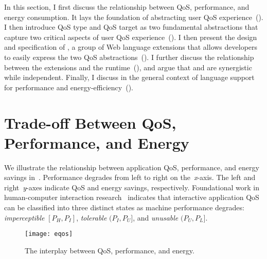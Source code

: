 In this section, I first discuss the relationship between QoS, performance, and energy consumption. It lays the foundation of abstracting user QoS experience~(). I then introduce QoS type and QoS target as two fundamental abstractions that capture two critical aspects of user QoS experience~(). I then present the design and specification of \greenweb, a group of Web language extensions that allows developers to easily express the two QoS abstractions~(). I further discuss the relationship between the \greenweb extensions and the \webrt runtime~(), and argue that \greenweb and \webrt are synergistic while independent. Finally, I discuss \greenweb in the general context of language support for performance and energy-efficiency~().

\section{Trade-off Between QoS, Performance, and Energy}
\label{sec:lang:eqos}

We illustrate the relationship between application QoS, performance, and energy savings in~. Performance degrades from left to right on the~\textit{x}-axis. The left and right~\textit{y}-axes indicate QoS and energy savings, respectively. Foundational work in human-computer interaction research~\cite{eventlatency,designUI,info_vis,response_time,percent_done,usability_engineering} indicates that interactive application QoS can be classified into three distinct states as machine performance degrades: \textit{imperceptible} $[P_H,P_I]$, \textit{tolerable} $(P_I,P_U]$, and \textit{unusable} $(P_U,P_L]$.

\begin{figure}[h]
\centering
\captionsetup{width=.7\columnwidth}
\texttt{[image: eqos]}
\caption{\small{The interplay between QoS, performance, and energy.}}
\label{fig:eqos}
\end{figure}

